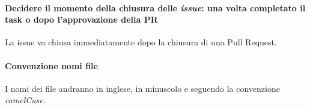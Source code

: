 \documentclass[11pt]{meetingmins}
\begin{document}
		
	\paragraph*{Decidere il momento della chiusura delle \textit{issue}: una volta completato il task o dopo l'approvazione della PR}
		La issue va chiusa immediatamente dopo la chiusura di una Pull Request.
		
	\paragraph*{Convenzione nomi file}
		I nomi dei file andranno in inglese, in minuscolo e seguendo la convenzione \textit{camelCase}.


\end{document}
